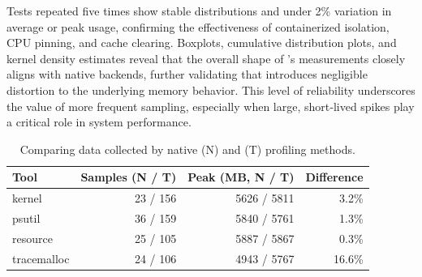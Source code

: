 Tests repeated five times show stable distributions and under 2\% variation in average or peak usage, confirming the effectiveness of containerized isolation, \ac{CPU} pinning, and cache clearing.
Boxplots, cumulative distribution plots, and kernel density estimates reveal that the overall shape of \traceq’s measurements closely aligns with native backends, further validating that \traceq introduces negligible distortion to the underlying memory behavior.
This level of reliability underscores the value of more frequent sampling, especially when large, short‑lived spikes play a critical role in system performance.

\begin{table}[!ht]
    \centering
    \caption{Comparing data collected by native (N) and \traceq (T) profiling methods.}
    \label{tab:mmc-metrics}
    \begin{tabular}{lrrr}
        \toprule
        \textbf{Tool} & \textbf{Samples (N / T)} & \textbf{Peak (MB, N / T)} & \textbf{Difference} \\
        \midrule
        kernel        & 23 / 156                 & 5626 / 5811               & 3.2\%               \\
        psutil        & 36 / 159                 & 5840 / 5761               & 1.3\%               \\
        resource      & 25 / 105                 & 5887 / 5867               & 0.3\%               \\
        tracemalloc   & 24 / 106                 & 4943 / 5767               & 16.6\%              \\
        \bottomrule
    \end{tabular}
\end{table}
